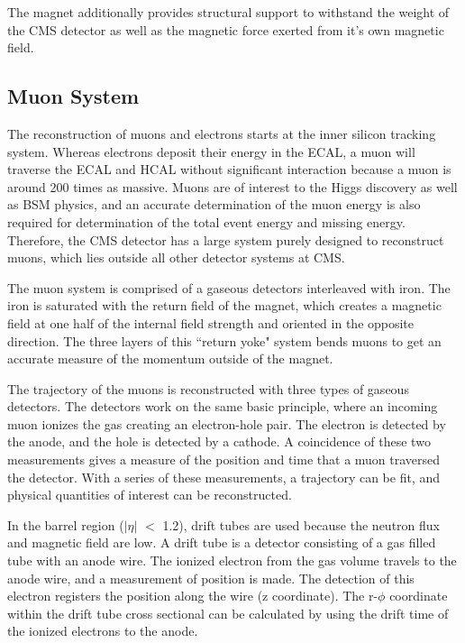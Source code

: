 The magnet additionally provides structural support to withstand the weight of the CMS detector as well as the magnetic force exerted from it's own magnetic field.  

\subsection{Muon System}
The reconstruction of muons and electrons starts at the inner silicon tracking system.  
Whereas electrons deposit their energy in the ECAL, a muon will traverse the ECAL and HCAL without significant interaction because a muon is around 200 times as massive.  
Muons are of interest to the Higgs discovery as well as BSM physics, 
and an accurate determination of the muon energy is also required for determination of the total event energy and missing energy.  
Therefore, the CMS detector has a large system purely designed to reconstruct muons, which lies outside all other detector systems at CMS.  

The muon system is comprised of a gaseous detectors interleaved with iron.  
The iron is saturated with the return field of the magnet, which creates a magnetic field at one half of the internal field strength and oriented in the opposite direction.  
The three layers of this ``return yoke" system bends muons to get an accurate measure of the momentum outside of the magnet.  

The trajectory of the muons is reconstructed with three types of gaseous detectors.  
The detectors work on the same basic principle, where an incoming muon ionizes the gas creating an electron-hole pair.  
The electron is detected by the anode, and the hole is detected by a cathode.  
A coincidence of these two measurements gives a measure of the position and time that a muon traversed the detector.  
With a series of these measurements, a trajectory can be fit, and physical quantities of interest can be reconstructed.  

In the barrel region ($|\eta|$ $<$ 1.2), drift tubes are used because the neutron flux and magnetic field are low.  
A drift tube is a detector consisting of a gas filled tube with an anode wire.  
The ionized electron from the gas volume travels to the anode wire, and a measurement of position is made.  
The detection of this electron registers the position along the wire (z coordinate).  
The r-$\phi$ coordinate within the drift tube cross sectional can be calculated by using the drift time of the ionized electrons to the anode.  

